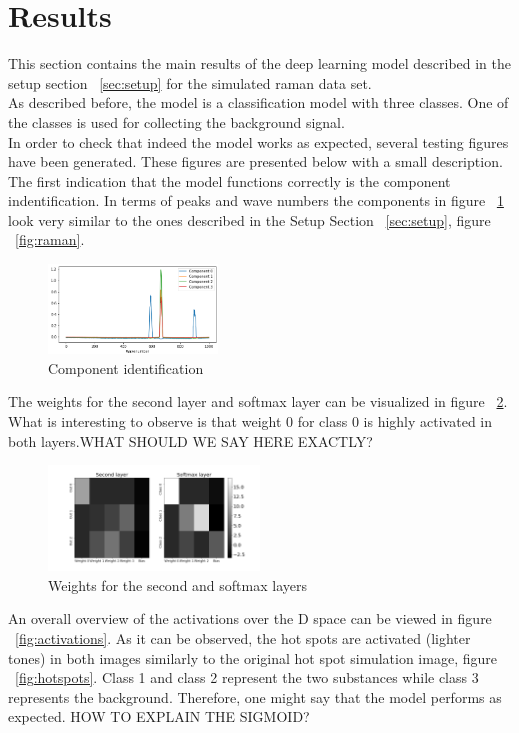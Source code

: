 \documentclass{article}
\begin{document}
\section{Results}
\label{sec:results}
This section contains the main results of the deep learning model described in the setup section ~\ref{sec:setup} for the simulated raman data set.\\
As described before, the model is a classification model with three classes. One of the classes is used for collecting the background signal.\\
In order to check that indeed the model works as expected, several testing figures have been generated. These figures are presented below with a small description.\\
The first indication that the model functions correctly is the component indentification. In terms of peaks and wave numbers the components in figure ~\ref{fig:components} look very similar to the ones described in the Setup Section ~\ref{sec:setup}, figure ~\ref{fig:raman}.
\begin{figure}[H]
	\centering
	\includegraphics[width=0.4\textwidth]{figures_3/raman_sim_3_encode_layer_1_finetune_13.png}
	\caption{Component identification}
	\label{fig:components}
\end{figure}
The weights for the second layer and softmax layer can be visualized in figure ~\ref{fig:weights}. What is interesting to observe is that weight 0 for class 0 is highly activated in both layers.WHAT SHOULD WE SAY HERE EXACTLY?\\ 
\begin{figure}[H]
  \includegraphics[width=0.5\textwidth]{figures_2/raman_sim_second_softmax_encode.png}
  \caption{Weights for the second and softmax layers}
  \label{fig:weights}
\end{figure}
An overall overview of the activations over the D space can be viewed in figure ~\ref{fig:activations}. As it can be observed, the hot spots are activated (lighter tones) in both images similarly to the original hot spot simulation image, figure ~\ref{fig:hotspots}. Class 1 and class 2 represent the two substances while class 3 represents the background. Therefore, one might say that the model performs as expected. HOW TO EXPLAIN THE SIGMOID?
\end{document}
